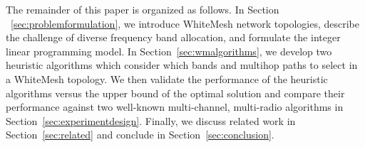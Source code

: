 The remainder of this paper is organized as follows. In Section ~\ref{sec:problemformulation}, 
we introduce WhiteMesh network topologies, describe the challenge of diverse frequency band allocation, and formulate the integer linear 
programming model. In Section~\ref{sec:wmalgorithms}, we develop two heuristic algorithms which consider which bands 
and multihop paths to select in a WhiteMesh topology.  We then validate the performance of the heuristic algorithms 
versus the upper bound of the optimal solution and compare their performance against two well-known multi-channel, 
multi-radio algorithms in Section~\ref{sec:experimentdesign}. Finally, we discuss related work in Section~\ref{sec:related} 
and conclude in Section~\ref{sec:conclusion}.



